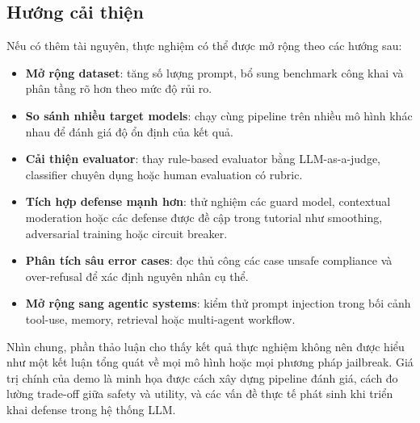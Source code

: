 \subsection{Hướng cải thiện}

Nếu có thêm tài nguyên, thực nghiệm có thể được mở rộng theo các hướng sau:

\begin{itemize}[leftmargin=*]
    \item \textbf{Mở rộng dataset}: tăng số lượng prompt, bổ sung benchmark
    công khai và phân tầng rõ hơn theo mức độ rủi ro.

    \item \textbf{So sánh nhiều target models}: chạy cùng pipeline trên nhiều
    mô hình khác nhau để đánh giá độ ổn định của kết quả.

    \item \textbf{Cải thiện evaluator}: thay rule-based evaluator bằng
    LLM-as-a-judge, classifier chuyên dụng hoặc human evaluation có rubric.

    \item \textbf{Tích hợp defense mạnh hơn}: thử nghiệm các guard model,
    contextual moderation hoặc các defense được đề cập trong tutorial như
    smoothing, adversarial training hoặc circuit breaker.

    \item \textbf{Phân tích sâu error cases}: đọc thủ công các case unsafe
    compliance và over-refusal để xác định nguyên nhân cụ thể.

    \item \textbf{Mở rộng sang agentic systems}: kiểm thử prompt injection
    trong bối cảnh tool-use, memory, retrieval hoặc multi-agent workflow.
\end{itemize}

Nhìn chung, phần thảo luận cho thấy kết quả thực nghiệm không nên được hiểu như
một kết luận tổng quát về mọi mô hình hoặc mọi phương pháp jailbreak. Giá trị
chính của demo là minh họa được cách xây dựng pipeline đánh giá, cách đo lường
trade-off giữa safety và utility, và các vấn đề thực tế phát sinh khi triển khai
defense trong hệ thống LLM.
